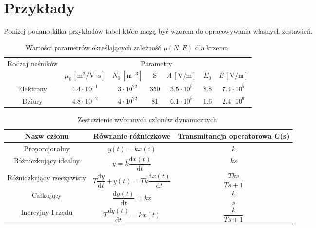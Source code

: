 \section{Przykłady}
Poniżej podano kilka przykładów tabel które mogą być wzorem do opracowywania własnych 
zestawień.
\begin{table}[h!]
	\centering
	\caption{Wartości parametrów określających zależność $\mu(N,E)$ dla krzemu.}
	\begin{tabular}{|c|c|c|c|c|c|c|}
		\hline  
		\multirow{2}{*}{Rodzaj nośników} & \multicolumn{6}{c|}{Parametry} \\\cline{2-7}
				& $\mu_0\,[\mathrm{m}^2/\mathrm{V\cdot s}]$ & $N_0\,[\mathrm{m}^{-3}]$ & $\mathrm{S}$ & $A\,[\mathrm{V}/\mathrm{m}]$& $E_0$ & $B\,[\mathrm{V}/\mathrm{m}]$\\
		\hline
			Elektrony & $1.4\cdot 10^{-1}$ & $3\cdot 10^{22}$ & 350 & $3.5\cdot 10^5$ & $8.8$ & $7.4\cdot 10^5$ \\
		\hline
			Dziury & $4.8\cdot 10^{-2}$ & $4\cdot 10^{22}$ & 81 & $6.1\cdot 10^5$ & $1.6$ & $2.4\cdot 10^6$ \\
		\hline
	\end{tabular}
\label{tab:wartosciKrzemu}
\end{table}
\begin{table}[h!]
	\caption{Zestawienie wybranych członów dynamicznych.}
\centering
	\begin{tabular}{|c|c|c|}
		\hline
			Nazw członu & Równanie różniczkowe & Transmitancja operatorowa G(s)\\
		\hline
			\multirow{2}{*}{Proporcjonalny} & \multirow{2}{*}{$y(t)=kx(t)$} & \multirow{2}{*}{$k$}\\
			  &  & \\
		\hline
			\multirow{2}{*}{Różniczkujący idealny} & 
				\multirow{2}{*}{$y=k\dfrac{\mathrm{d}x(t)}{\mathrm{d}t}$} 
				& \multirow{2}{*}{$ks$}\\
				&  & \\
		\hline
			\multirow{2}{*}{Różniczkujący rzeczywisty} & 
				\multirow{2}{*}{$T\dfrac{\mathrm{d}y}{\mathrm{d}t}+y(t)=Tk\dfrac{\mathrm{d}x(t)}{\mathrm{d}t} $} 
				& \multirow{2}{*}{$\dfrac{Tks}{Ts+1}$}\\
				&  & \\
		\hline
		   \multirow{2}{*}{Całkujący} & \multirow{2}{*}{$\dfrac{\mathrm{d}y(t)}{\mathrm{d}t}=kx$} & 
         \multirow{2}{*}{$\dfrac{k}{s}$}\\
				&  & \\
		\hline
			\multirow{2}{*}{Inercyjny I rzędu} & \multirow{2}{*}{$T\dfrac{\mathrm{d}y(t)}{\mathrm{d}t}=kx(t) $} 
				& \multirow{2}{*}{$\dfrac{k}{Ts+1}$}\\
				&  & \\
		\hline
	\end{tabular}
\label{tab:zestTrans}
\end{table}
